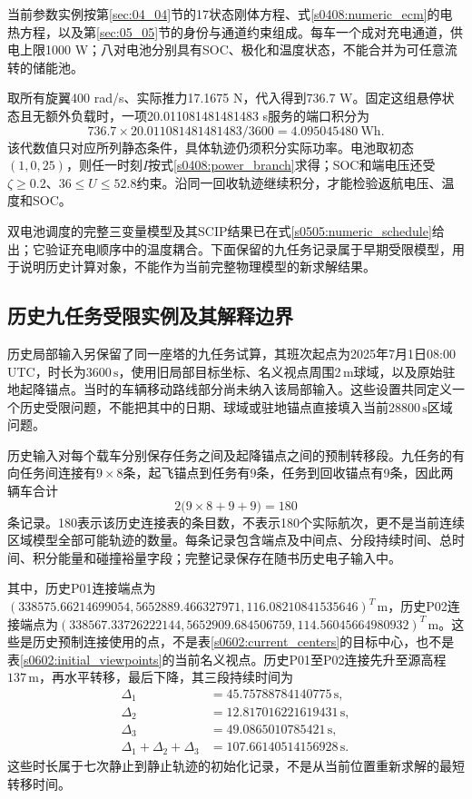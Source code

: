 当前参数实例按第\ref{sec:04_04}节的17状态刚体方程、式\eqref{s0408:numeric_ecm}的电热方程，以及第\ref{sec:05_05}节的身份与通道约束组成。每车一个成对充电通道，供电上限1000 W；八对电池分别具有SOC、极化和温度状态，不能合并为可任意流转的储能池。

取所有旋翼400 rad/s、实际推力17.1675 N，代入得到736.7 W。固定这组悬停状态且无额外负载时，一项20.011081481481483 s服务的端口积分为
\begin{equation}
 736.7\times20.011081481481483/3600=4.095045480\ \mathrm{Wh}.
\end{equation}
该代数值只对应所列静态条件，具体轨迹仍须积分实际功率。电池取初态$(1,0,25)$，则任一时刻$I$按式\eqref{s0408:power_branch}求得；SOC和端电压还受$\zeta\ge0.2$、$36\le U\le52.8$约束。沿同一回收轨迹继续积分，才能检验返航电压、温度和SOC。

双电池调度的完整三变量模型及其SCIP结果已在式\eqref{s0505:numeric_schedule}给出；它验证充电顺序中的温度耦合。下面保留的九任务记录属于早期受限模型，用于说明历史计算对象，不能作为当前完整物理模型的新求解结果。

\subsection{历史九任务受限实例及其解释边界}

历史局部输入另保留了同一座塔的九任务试算，其班次起点为2025年7月1日08:00 UTC，时长为$3600\,\mathrm s$，使用旧局部目标坐标、名义视点周围$2\,\mathrm m$球域，以及原始驻地起降锚点。当时的车辆移动路线部分尚未纳入该局部输入。这些设置共同定义一个历史受限问题，不能把其中的日期、球域或驻地锚点直接填入当前$28800\,\mathrm s$区域问题。

历史输入对每个载车分别保存任务之间及起降锚点之间的预制转移段。九任务的有向任务间连接有$9\times8$条，起飞锚点到任务有9条，任务到回收锚点有9条，因此两辆车合计
\begin{equation}
 2\bigl(9\times8+9+9\bigr)=180
 \label{s0602:historical_leg_count}
\end{equation}
条记录。180表示该历史连接表的条目数，不表示180个实际航次，更不是当前连续区域模型全部可能轨迹的数量。每条记录包含端点及中间点、分段持续时间、总时间、积分能量和碰撞裕量字段；完整记录保存在随书历史电子输入中。

其中，历史P01连接端点为$(338575.66214699054,5652889.466327971,116.08210841535646)^T\,\mathrm m$，历史P02连接端点为$(338567.33726222144,5652909.684506759,114.56045664980932)^T\,\mathrm m$。这些是历史预制连接使用的点，不是表\ref{s0602:current_centers}的目标中心，也不是表\ref{s0602:initial_viewpoints}的当前名义视点。历史P01至P02连接先升至源高程$137\,\mathrm m$，再水平转移，最后下降，其三段持续时间为
\begin{align}
 \Delta_1&=45.75788784140775\,\mathrm s,\\
 \Delta_2&=12.817016221619431\,\mathrm s,\\
 \Delta_3&=49.0865010785421\,\mathrm s,\\
 \Delta_1+\Delta_2+\Delta_3
 &=107.66140514156928\,\mathrm s.
 \label{s0602:historical_transfer_time}
\end{align}
这些时长属于七次静止到静止轨迹的初始化记录，不是从当前位置重新求解的最短转移时间。

